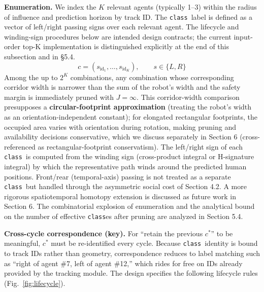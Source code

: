 \documentclass[11pt]{article}
\newcommand{\Class}{\texttt{class}}
\begin{document}
\textbf{Enumeration.} We index the $K$ relevant agents (typically 1--3) within the radius of influence and prediction horizon by track ID. The \Class\ label is defined as a vector of left/right passing signs over each relevant agent. The lifecycle and winding-sign procedures below are intended design contracts; the current input-order top-K implementation is distinguished explicitly at the end of this subsection and in \S5.4.
\begin{equation}
c = (s_{\mathrm{id}_1}, \ldots, s_{\mathrm{id}_K}), \qquad s \in \{L, R\}
\end{equation}
Among the up to $2^K$ combinations, any combination whose corresponding corridor width is narrower than the sum of the robot's width and the safety margin is immediately pruned with $J = \infty$. This corridor-width comparison presupposes a \textbf{circular-footprint approximation} (treating the robot's width as an orientation-independent constant); for elongated rectangular footprints, the occupied area varies with orientation during rotation, making pruning and availability decisions conservative, which we discuss separately in Section 6 (cross-referenced as rectangular-footprint conservatism). The left/right sign of each \Class\ is computed from the winding sign (cross-product integral or H-signature integral) by which the representative path winds around the predicted human positions. Front/rear (temporal-axis) passing is not treated as a separate \Class\ but handled through the asymmetric social cost of Section 4.2. A more rigorous spatiotemporal homotopy extension is discussed as future work in Section 6. The combinatorial explosion of enumeration and the analytical bound on the number of effective \Class{es} after pruning are analyzed in Section 5.4.

\textbf{Cross-cycle correspondence (key).} For ``retain the previous $c^*$'' to be meaningful, $c^*$ must be re-identified every cycle. Because \Class\ identity is bound to track IDs rather than geometry, correspondence reduces to label matching such as ``right of agent \#7, left of agent \#12,'' which rides for free on IDs already provided by the tracking module. The design specifies the following lifecycle rules (Fig.~\ref{fig:lifecycle}).
\end{document}
